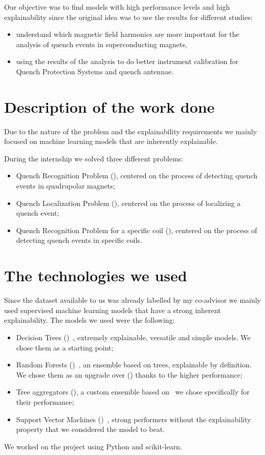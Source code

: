 \documentclass[a4paper, notitlepage]{article}
\begin{document}
Our objective was to find models with high performance levels and high explainability since the
original idea was to use the results for different studies:
\begin{itemize}
	\item understand which magnetic field harmonics are more important for the analysis of
	      quench events in superconducting magnets,
	\item using the results of the analysis to do better instrument calibration for Quench
	      Protection Systems and quench antennae.
\end{itemize}

\section{Description of the work done}
Due to the nature of the problem and the explainability requirements we mainly focused on machine
learning models that are inherently explainable.

During the internship we solved three different problems:
\begin{itemize}
	\item Quench Recognition Problem (\qrp), centered on the process of detecting quench events in
	      quadrupolar magnets;
	\item Quench Localization Problem (\qlp), centered on the process of localizing a quench event;
	\item Quench Recognition Problem for a specific coil (\qrpi), centered on the process of detecting
	      quench events in specific coils.
\end{itemize}

\section{The technologies we used}
Since the dataset available to us was already labelled by my co-advisor we mainly used supervised
machine learning models that have a strong inherent explainability. The models we used were the
following:
\begin{itemize}
	\item Decision Trees (\dts)~\cite{breiman1984-dt}, extremely explainable, versatile and simple models. We chose them as a
	      starting point;
	\item Random Forests (\rfs)~\cite{breiman2001-rf}, an ensemble based on trees, explainable by definition. We chose them
	      as an upgrade over (\dts) thanks to the higher performance;
	\item Tree aggregators (\tas), a custom ensemble based on \dts\ we chose specifically for
	      their performance;
	\item Support Vector Machines (\svms)~\cite{cortes1995-svm}, strong performers without the
	      explainability property that we considered the model to beat.
\end{itemize}
We worked on the project using Python and scikit-learn.
\end{document}
